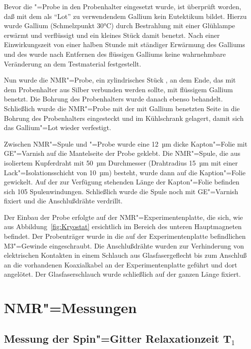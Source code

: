 Bevor die \aug"=Probe in den Probenhalter eingesetzt wurde, ist überprüft worden, daß \aug{} mit
dem als "`Lot"' zu verwendendem Gallium kein Eutektikum bildet. Hierzu wurde Gallium (Schmelzpunkt
30°C) durch Bestrahlung mit einer Glühlampe erwärmt und verflüssigt und ein kleines Stück \aug{}
damit benetzt. Nach einer Einwirkungszeit von einer halben Stunde mit ständiger Erwärmung des
Galliums und des \aug{} wurde nach Entfernen des flüssigen Galliums keine wahrnehmbare Veränderung
an dem \aug{} Testmaterial festgestellt.

Nun wurde die NMR"=Probe, ein zylindrisches Stück \aug{}, an dem Ende, das mit dem Probenhalter aus
Silber verbunden werden sollte, mit flüssigem Gallium benetzt. Die Bohrung des Probenhalters wurde
danach ebenso behandelt. Schließlich wurde die NMR"=Probe mit der mit
Gallium benetzten Seite in die Bohrung des Probenhalters eingesteckt und im Kühlschrank gelagert,
damit sich das Gallium"=Lot wieder verfestigt.

Zwischen NMR"=Spule und \aug"=Probe wurde eine 12~µm dicke Kapton"=Folie mit GE"=Varnish
auf die Mantelseite der Probe geklebt. Die NMR"=Spule, die aus isoliertem Kupferdraht mit 50~µm
Durchmesser (Drahtradius 15~µm mit einer Lack"=Isolationsschicht von 10~µm) besteht, wurde dann
auf die Kaption"=Folie gewickelt. Auf der zur Verfügung stehenden Länge der Kapton"=Folie befinden
sich 105 Spulenwindungen. Schließlich wurde die Spule noch mit GE"=Varnish fixiert und die
Anschlußdrähte verdrillt.

Der Einbau der Probe erfolgte auf der NMR"=Experimentenplatte, die sich, wie aus
Abbildung~\ref{fig:Kryostat} ersichtlich im Bereich des unteren Hauptmagneten befindet. Der Probenträger wurde
in die auf der Experimentenplatte befindlichen M3"=Gewinde eingeschraubt. Die Anschlußdrähte wurden
zur Verhinderung von elektrischen Kontakten in einem Schlauch aus Glasfasergeflecht bis zum
Anschluß an die vorhandenen Koaxialkabel an der Experimentenplatte geführt und dort angelötet.
Der Glasfaserschlauch wurde schließlich auf der ganzen Länge fixiert.


\section{NMR"=Messungen}

\subsection{Messung der Spin"=Gitter Relaxationzeit T$_1$}

